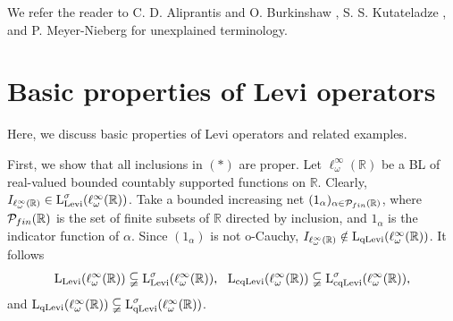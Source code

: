 \documentclass[10pt]{article}
\makeatletter
\renewcommand{\subsection}{\@startsection{subsection}{1}
{0pt}{3.25ex plus 1ex minus.2ex}{-1em}{\normalfont\normalsize\bf}}
\makeatother
\begin{document}
{{{\medskip
We refer the reader to C. D. Aliprantis and O. Burkinshaw \cite{AB2006}, S. S. Kutateladze \cite{Kut1983}, and P. Meyer-Nieberg \cite{Mey1991} for unexplained terminology.

\section{Basic properties of Levi operators}

\hspace{4mm}
Here, we discuss basic properties of Levi operators and related examples.

\medskip
First, we show that all inclusions in $(*)$ are proper.
Let $\ell^\infty_\omega(\mathbb{R})$ be a BL of 
real-valued bounded countably supported functions on $\mathbb{R}$. 
Clearly, $I_{\ell^\infty_\omega(\mathbb{R})}\in
\text{\rm L}^\sigma_{\text{\rm Levi}}(\ell^\infty_\omega(\mathbb{R}))$. 
Take a bounded 
increasing net $(1_\alpha)_{\alpha\in{\cal P}_{fin}(\mathbb{R})}$, where
${\cal P}_{fin}(\mathbb{R})$ is the set of finite subsets of $\mathbb{R}$
directed by inclusion, and $1_\alpha$  is the indicator function of 
$\alpha$. Since $(1_\alpha)$ is not o-Cauchy, 
$I_{\ell^\infty_\omega(\mathbb{R})}\notin
\text{\rm L}_{\text{\rm qLevi}}(\ell^\infty_\omega(\mathbb{R}))$.  
It follows
$$
   \text{\rm L}_{\text{\rm Levi}}(\ell^\infty_\omega(\mathbb{R}))\subsetneqq
   \text{\rm L}^\sigma_{\text{\rm Levi}}(\ell^\infty_\omega(\mathbb{R})), \ \
   \text{\rm L}_{\text{\rm cqLevi}}(\ell^\infty_\omega(\mathbb{R}))\subsetneqq
   \text{\rm L}^\sigma_{\text{\rm cqLevi}}(\ell^\infty_\omega(\mathbb{R})), 
$$
and $\text{\rm L}_{\text{\rm qLevi}}(\ell^\infty_\omega(\mathbb{R}))\subsetneqq\text{\rm L}^\sigma_{\text{\rm qLevi}}(\ell^\infty_\omega(\mathbb{R}))$. 

}}}
\end{document}
